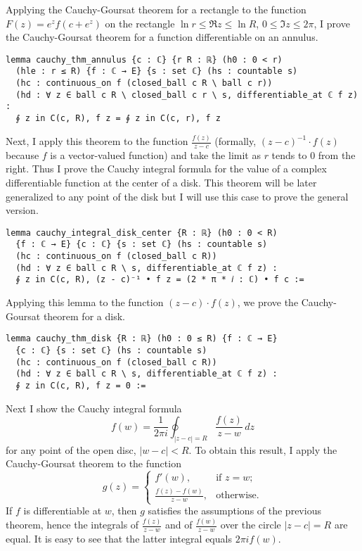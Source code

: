\documentclass[a4paper,UKenglish,cleveref, autoref, thm-restate]{lipics-v2021}
\begin{document}
Applying the Cauchy-Goursat theorem for a rectangle to the function
\(F(z)=e^{z}f(c+e^{z})\) on the rectangle \(\ln r\le \Re z\le \ln R\),
\(0\le \Im z\le 2\pi\), I prove the Cauchy-Goursat theorem for a
function differentiable on an annulus.

\begin{lstlisting}[caption=The Cauchy-Goursat theorem for an annulus,label=lst:cauchy-annulus]
lemma cauchy_thm_annulus {c : ℂ} {r R : ℝ} (h0 : 0 < r)
  (hle : r ≤ R) {f : ℂ → E} {s : set ℂ} (hs : countable s)
  (hc : continuous_on f (closed_ball c R \ ball c r))
  (hd : ∀ z ∈ ball c R \ closed_ball c r \ s, differentiable_at ℂ f z) :
  ∮ z in C(c, R), f z = ∮ z in C(c, r), f z
\end{lstlisting}

Next, I apply this theorem to the function \(\frac{f(z)}{z-c}\)
(formally, \((z-c)^{-1}\cdot f(z)\) because \(f\) is a vector-valued
function) and take the limit as \(r\) tends to \(0\) from the
right. Thus I prove the Cauchy integral formula for the value of a
complex differentiable function at the center of a disk. This theorem
will be later generalized to any point of the disk but I will use this
case to prove the general version.

\begin{lstlisting}[caption=Cauchy integral formula for the center of a disk,label=lst:cauchy-int-center]
lemma cauchy_integral_disk_center {R : ℝ} (h0 : 0 < R)
  {f : ℂ → E} {c : ℂ} {s : set ℂ} (hs : countable s)
  (hc : continuous_on f (closed_ball c R))
  (hd : ∀ z ∈ ball c R \ s, differentiable_at ℂ f z) :
  ∮ z in C(c, R), (z - c)⁻¹ • f z = (2 * π * 𝑖 : ℂ) • f c :=
\end{lstlisting}

Applying this lemma to the function \((z-c)\cdot f(z)\), we prove the
Cauchy-Goursat theorem for a disk.

\begin{lstlisting}[caption=The Cauchy-Goursat theorem for a disk,label=lst:cauchy-circle]
lemma cauchy_thm_disk {R : ℝ} (h0 : 0 ≤ R) {f : ℂ → E}
  {c : ℂ} {s : set ℂ} (hs : countable s)
  (hc : continuous_on f (closed_ball c R))
  (hd : ∀ z ∈ ball c R \ s, differentiable_at ℂ f z) :
  ∮ z in C(c, R), f z = 0 :=
\end{lstlisting}

Next I show the Cauchy integral formula
\[
  f(w)=\frac{1}{2\pi i}\oint_{|z-c|=R}\frac{f(z)}{z-w}\,dz
\]
for any point of the open disc, \(|w-c|<R\). To obtain this result, I
apply the Cauchy-Goursat theorem to the function
\[
  g(z)=
  \begin{cases}
    f'(w),&\text{if }z=w;\\
    \frac{f(z)-f(w)}{z-w},&\text{otherwise}.
  \end{cases}
\]
If \(f\) is differentiable at \(w\), then \(g\) satisfies the
assumptions of the previous theorem, hence the integrals of
\(\frac{f(z)}{z-w}\) and of \(\frac{f(w)}{z-w}\) over the circle
\(|z-c|=R\) are equal. It is easy to see that the latter integral
equals \(2\pi i f(w)\).
\end{document}
